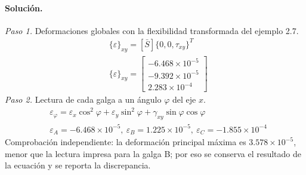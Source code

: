 \documentclass[11pt]{article}
\begin{document}
\paragraph{Solución.}
\begin{center}\end{center}

\textit{Paso 1.} Deformaciones globales con la flexibilidad transformada del ejemplo 2.7.
\begin{align*}
&\{\varepsilon\}_{xy}=[\bar S]\{0,0,\tau_{xy}\}^T \\
&\{\varepsilon\}_{xy}=\begin{bmatrix}-6.468\times10^{-5} \\ -9.392\times10^{-5} \\ 2.283\times10^{-4}\end{bmatrix}
\end{align*}
\textit{Paso 2.} Lectura de cada galga a un ángulo $\varphi$ del eje $x$.
\begin{align*}
&\varepsilon_\varphi=\varepsilon_x\cos^2\varphi+\varepsilon_y\sin^2\varphi+\gamma_{xy}\sin\varphi\cos\varphi \\
&\varepsilon_A=-6.468\times10^{-5},\ \varepsilon_B=1.225\times10^{-5},\ \varepsilon_C=-1.855\times10^{-4}
\end{align*}
Comprobación independiente: la deformación principal máxima es $3.578\times10^{-5}$, menor que la lectura impresa para la galga B; por eso se conserva el resultado de la ecuación y se reporta la discrepancia.
\end{document}
